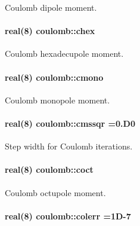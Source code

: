 Coulomb dipole moment. 

\paragraph[{\texorpdfstring{chex}{chex}}]{\setlength{\rightskip}{0pt plus 5cm}real(8) coulomb\+::chex}\hypertarget{namespacecoulomb_ad110abadb05ffa8e3f56e113982107dd}{}\label{namespacecoulomb_ad110abadb05ffa8e3f56e113982107dd}


Coulomb hexadecupole moment. 

\paragraph[{\texorpdfstring{cmono}{cmono}}]{\setlength{\rightskip}{0pt plus 5cm}real(8) coulomb\+::cmono}\hypertarget{namespacecoulomb_aa87ca99119e06734684a442096f66a9f}{}\label{namespacecoulomb_aa87ca99119e06734684a442096f66a9f}


Coulomb monopole moment. 

\paragraph[{\texorpdfstring{cmssqr}{cmssqr}}]{\setlength{\rightskip}{0pt plus 5cm}real(8) coulomb\+::cmssqr =0.\+D0}\hypertarget{namespacecoulomb_a31931c26339890d5d66b1516a05a980a}{}\label{namespacecoulomb_a31931c26339890d5d66b1516a05a980a}


Step width for Coulomb iterations. 

\paragraph[{\texorpdfstring{coct}{coct}}]{\setlength{\rightskip}{0pt plus 5cm}real(8) coulomb\+::coct}\hypertarget{namespacecoulomb_ae7bc3b66c52d01cd2a966481a18edceb}{}\label{namespacecoulomb_ae7bc3b66c52d01cd2a966481a18edceb}


Coulomb octupole moment. 

\paragraph[{\texorpdfstring{colerr}{colerr}}]{\setlength{\rightskip}{0pt plus 5cm}real(8) coulomb\+::colerr =1\+D-\/7}\hypertarget{namespacecoulomb_ad503a40a54dbeb40ad5ba58cb265828e}{}\label{namespacecoulomb_ad503a40a54dbeb40ad5ba58cb265828e}


